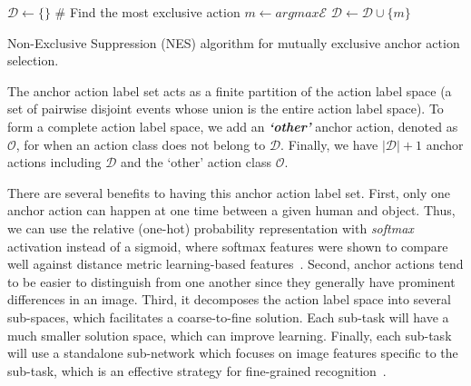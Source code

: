 \begin{algorithm}[ht]
\KwIn{
$\mathcal{E}=\{e_{i}, i \in [0, N)\}, \mathcal{C}=\{c_{ij}, i,j \in [0, N)\}$\;
}
\Begin
{
  $\mathcal{D} \gets \{\}$  \;
{
    \# Find the most exclusive action\;
    $m \gets argmax \mathcal{E}$\;
$\mathcal{D} \gets \mathcal{D} \cup \{m\}$  \;
  }
}
\caption{
{Non-Exclusive Suppression (NES) algorithm for mutually exclusive anchor action selection.
}
}
\label{alg:correlation}
\end{algorithm}


The anchor action {label} set acts as a finite partition of the action {label} space (a set of pairwise disjoint events whose union is the entire action {label} space). To form a complete action {label} space, we add an \emph{\textbf{`other'}} anchor action, denoted as $\mathcal{O}$, for when an action {class} does not belong to $\mathcal{D}$. 
Finally, we have $|\mathcal{D}| + 1$ anchor actions including $\mathcal{D}$ and the `other' action {class} $\mathcal{O}$. 







There are several benefits to having this anchor action {label} set.
First, only one anchor action can happen at one time between a given human and object. Thus, we can use the relative (one-hot) probability representation with \emph{softmax} activation instead of a sigmoid, where softmax features were shown to compare well against distance metric learning-based features~\cite{horiguchi2019significance}.
Second, anchor actions tend to be easier to distinguish from one another since they generally have prominent differences in an image.
Third, it decomposes the action {label} space into several sub-spaces, which facilitates a coarse-to-fine solution. Each sub-task will have a much smaller solution space, which can improve learning.
Finally, each sub-task will use a standalone sub-network which focuses on image features specific to the sub-task, which is an effective strategy for fine-grained recognition~\cite{fu2017look}.








